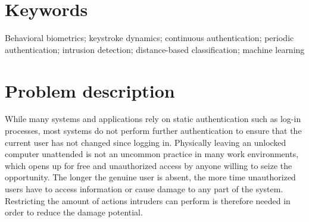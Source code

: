 \documentclass[informationsecurity]{gucmasterproject}
\begin{document}
\section{Keywords}
Behavioral biometrics; keystroke dynamics; continuous authentication; periodic authentication; intrusion detection; distance-based classification; machine learning 
%

\section{Problem description}
While many systems and applications rely on static authentication such as log-in processes, most systems do not perform further authentication to ensure that the current user has not changed since logging in.
Physically leaving an unlocked computer unattended is not an uncommon practice in many work environments, which opens up for free and unauthorized access by anyone willing to seize the opportunity.
The longer the genuine user is absent, the more time unauthorized users have to access information or cause damage to any part of the system.
Restricting the amount of actions intruders can perform is therefore needed in order to reduce the damage potential.
\end{document}
